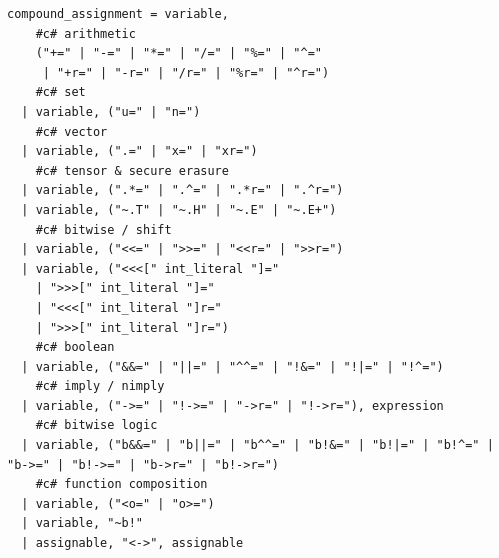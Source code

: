 \begin{verbatim}
compound_assignment = variable,
    #c# arithmetic
    ("+=" | "-=" | "*=" | "/=" | "%=" | "^=" 
     | "+r=" | "-r=" | "/r=" | "%r=" | "^r=")
    #c# set
  | variable, ("u=" | "n=")
    #c# vector
  | variable, (".=" | "x=" | "xr=")
    #c# tensor & secure erasure
  | variable, (".*=" | ".^=" | ".*r=" | ".^r=")
  | variable, ("~.T" | "~.H" | "~.E" | "~.E+")
    #c# bitwise / shift
  | variable, ("<<=" | ">>=" | "<<r=" | ">>r=")
  | variable, ("<<<[" int_literal "]=" 
    | ">>>[" int_literal "]=" 
    | "<<<[" int_literal "]r=" 
    | ">>>[" int_literal "]r=")
    #c# boolean
  | variable, ("&&=" | "||=" | "^^=" | "!&=" | "!|=" | "!^=")
    #c# imply / nimply
  | variable, ("->=" | "!->=" | "->r=" | "!->r="), expression
    #c# bitwise logic
  | variable, ("b&&=" | "b||=" | "b^^=" | "b!&=" | "b!|=" | "b!^=" | "b->=" | "b!->=" | "b->r=" | "b!->r=")
    #c# function composition
  | variable, ("<o=" | "o>=")
  | variable, "~b!"
  | assignable, "<->", assignable
\end{verbatim}

